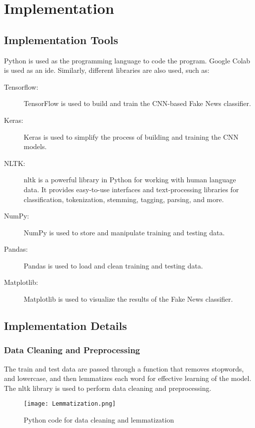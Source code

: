 \section{Implementation}

\subsection{Implementation Tools}
Python is used as the programming language to code the program. Google Colab is used as an \ac{ide}. Similarly, different libraries are also used, such as:

\begin{description}
    \item[Tensorflow:] TensorFlow is used to build and train the CNN-based Fake News classifier.
    \item[Keras:] Keras is used to simplify the process of building and training the CNN models.
    \item[NLTK:] \ac{nltk} is a powerful library in Python for working with human language data.  It provides easy-to-use interfaces and text-processing libraries for classification, tokenization, stemming, tagging, parsing, and more.
    \item[NumPy:] NumPy is used to store and manipulate training and testing data.
    \item[Pandas:] Pandas is used to load and clean training and testing data.
    \item[Matplotlib:] Matplotlib is used to visualize the results of the Fake News classifier.
\end{description}

\subsection{Implementation Details}

\subsubsection{Data Cleaning and Preprocessing} The train and test data are passed through a function that removes stopwords, and lowercase, and then lemmatizes each word for effective learning of the model. The \ac{nltk} library is used to perform data cleaning and preprocessing.

\begin{figure}[h]
    \centering
    \texttt{[image: Lemmatization.png]}
    \caption{Python code for data cleaning and lemmatization}
    \label{fig:lemmatization}
\end{figure}

